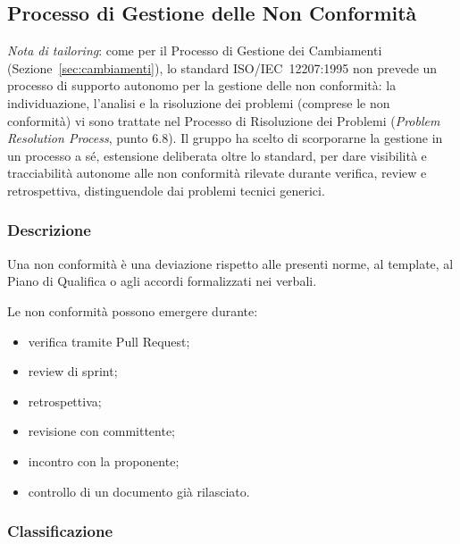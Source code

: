 
\subsection{Processo di Gestione delle Non Conformità}
\label{sec:non-conformita}

\textit{Nota di tailoring}: come per il Processo di Gestione dei Cambiamenti
(Sezione~\ref{sec:cambiamenti}), lo standard ISO/IEC~12207:1995 non prevede un
processo di supporto autonomo per la gestione delle non conformità: la
individuazione, l'analisi e la risoluzione dei problemi (comprese le non
conformità) vi sono trattate nel Processo di Risoluzione dei Problemi
(\textit{Problem Resolution Process}, punto 6.8). Il gruppo ha scelto di
scorporarne la gestione in un processo a sé, estensione deliberata oltre lo
standard, per dare visibilità e tracciabilità autonome alle non conformità
rilevate durante verifica, review e retrospettiva, distinguendole dai
problemi tecnici generici.

\subsubsection{Descrizione}

Una non conformità è una deviazione rispetto alle presenti norme, al template, al
Piano di Qualifica o agli accordi formalizzati nei verbali.

Le non conformità possono emergere durante:

\begin{itemize}
    \item verifica tramite Pull Request;
    \item review di sprint;
    \item retrospettiva;
    \item revisione con committente;
    \item incontro con la proponente;
    \item controllo di un documento già rilasciato.
\end{itemize}


\subsubsection{Classificazione}

